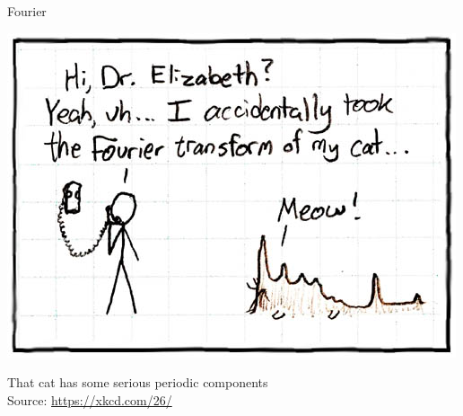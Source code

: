 
\begin{frame}[t,plain]
\titlepage
\end{frame}


\begin{frame}{Fourier}
%
\begin{center}
	\includegraphics[width=.5\linewidth]{./gfx/xkcd-Fourier}
	
	That cat has some serious periodic components\\
	Source: \url{https://xkcd.com/26/}
\end{center}
%
\end{frame}



